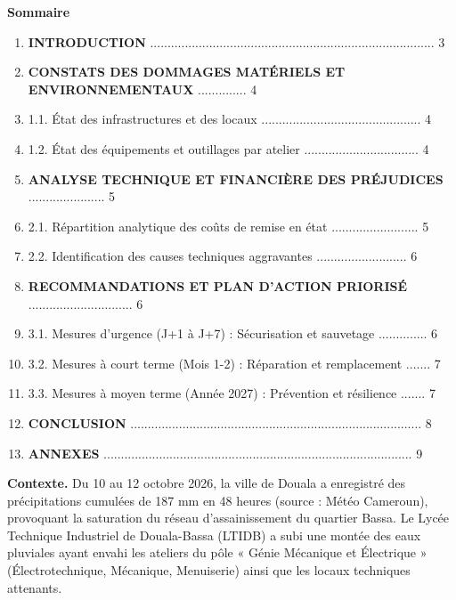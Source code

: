 \documentclass[11pt]{article}
\newcounter{popsec}
\newcounter{popsub}
\newcommand{\courssub}[1]{%
  \stepcounter{popsub}%
  \par\vspace{9pt}\noindent{\popxbold\fontsize{11.5}{13}\selectfont\color{popink}{\color{poporange}\thepopsec.\thepopsub}\hspace{6pt}#1}\par\nopagebreak\vspace{4pt}
}
\begin{document}
\begin{exoresolu}
\textbf{Sommaire}
\begin{enumerate}
    \item \textbf{INTRODUCTION} .................................................................................. 3
    \item \textbf{CONSTATS DES DOMMAGES MATÉRIELS ET ENVIRONNEMENTAUX} .............. 4
    \item \hspace{0.5cm} 1.1. État des infrastructures et des locaux .............................................. 4
    \item \hspace{0.5cm} 1.2. État des équipements et outillages par atelier ................................. 4
    \item \textbf{ANALYSE TECHNIQUE ET FINANCIÈRE DES PRÉJUDICES} ...................... 5
    \item \hspace{0.5cm} 2.1. Répartition analytique des coûts de remise en état ......................... 5
    \item \hspace{0.5cm} 2.2. Identification des causes techniques aggravantes .......................... 6
    \item \textbf{RECOMMANDATIONS ET PLAN D'ACTION PRIORISÉ} .............................. 6
    \item \hspace{0.5cm} 3.1. Mesures d'urgence (J+1 à J+7) : Sécurisation et sauvetage .............. 6
    \item \hspace{0.5cm} 3.2. Mesures à court terme (Mois 1-2) : Réparation et remplacement ....... 7
    \item \hspace{0.5cm} 3.3. Mesures à moyen terme (Année 2027) : Prévention et résilience ....... 7
    \item \textbf{CONCLUSION} .................................................................................... 8
    \item \textbf{ANNEXES} ......................................................................................... 9
\end{enumerate}

\courssub{Introduction}
\textbf{Contexte.} Du 10 au 12 octobre 2026, la ville de Douala a enregistré des précipitations cumulées de 187 mm en 48 heures (source : Météo Cameroun), provoquant la saturation du réseau d'assainissement du quartier Bassa. Le Lycée Technique Industriel de Douala-Bassa (LTIDB) a subi une montée des eaux pluviales ayant envahi les ateliers du pôle « Génie Mécanique et Électrique » (Électrotechnique, Mécanique, Menuiserie) ainsi que les locaux techniques attenants.


\end{exoresolu}
\end{document}
